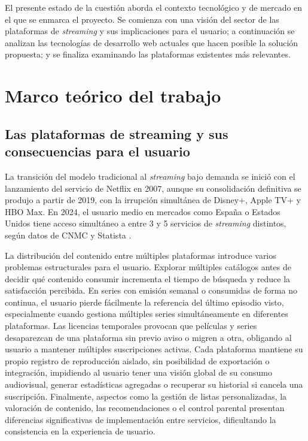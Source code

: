 El presente estado de la cuestión aborda el contexto tecnológico y de mercado en el que se enmarca el proyecto. Se comienza con una visión del sector de las plataformas de \textit{streaming} y sus implicaciones para el usuario; a continuación se analizan las tecnologías de desarrollo web actuales que hacen posible la solución propuesta; y se finaliza examinando las plataformas existentes más relevantes.

\section{Marco teórico del trabajo}

\subsection{Las plataformas de streaming y sus consecuencias para el usuario}

La transición del modelo tradicional al \textit{streaming} bajo demanda se inició con el lanzamiento del servicio de Netflix en 2007, aunque su consolidación definitiva se produjo a partir de 2019, con la irrupción simultánea de Disney+, Apple TV+ y HBO Max. En 2024, el usuario medio en mercados como España o Estados Unidos tiene acceso simultáneo a entre 3 y 5 servicios de \textit{streaming} distintos, según datos de CNMC y Statista \parencite{CNMC:2025,Statista:2024}.

La distribución del contenido entre múltiples plataformas introduce varios problemas estructurales para el usuario. Explorar múltiples catálogos antes de decidir qué contenido consumir incrementa el tiempo de búsqueda y reduce la satisfacción percibida. En series con emisión semanal o consumidas de forma no continua, el usuario pierde fácilmente la referencia del último episodio visto, especialmente cuando gestiona múltiples series simultáneamente en diferentes plataformas. Las licencias temporales provocan que películas y series desaparezcan de una plataforma sin previo aviso o migren a otra, obligando al usuario a mantener múltiples suscripciones activas. Cada plataforma mantiene su propio registro de reproducción aislado, sin posibilidad de exportación o integración, impidiendo al usuario tener una visión global de su consumo audiovisual, generar estadísticas agregadas o recuperar su historial si cancela una suscripción. Finalmente, aspectos como la gestión de listas personalizadas, la valoración de contenido, las recomendaciones o el control parental presentan diferencias significativas de implementación entre servicios, dificultando la consistencia en la experiencia de usuario.

